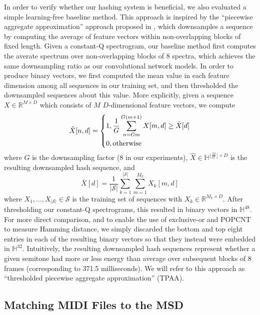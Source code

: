 In order to verify whether our hashing system is beneficial, we also evaluated a simple learning-free baseline method.
This approach is inspired by the ``piecewise aggregate approximation'' approach proposed in \cite{keogh2001dimensionality,yi2000fast}, which downsamples a sequence by computing the average of feature vectors within non-overlapping blocks of fixed length.
Given a constant-Q spectrogram, our baseline method first computes the averate spectrum over non-overlapping blocks of 8 spectra, which achieves the same downsampling ratio as our convolutional network models.
In order to produce binary vectors, we first computed the mean value in each feature dimension among all sequences in our training set, and then thresholded the downsampled sequences about this value.
More explicitly, given a sequence $X \in \mathbb{R}^{M \times D}$ which consists of $M$ $D$-dimensional feature vectors, we compute
\begin{equation}
\hat{X}[n, d] = \begin{dcases}
1, \frac{1}{G} \sum_{n = Gm}^{G(m + 1)} X[m, d] \ge \bar{X}[d]\\
0, \mathrm{otherwise}
\end{dcases}
\end{equation}
where $G$ is the downsampling factor ($8$ in our experiments), $\hat{X} \in \mathbb{H}^{\lfloor \frac{M}{G} \rfloor \times D}$ is the resulting downsampled hash sequence, and
\begin{equation}
\bar{X}[d] = \frac{1}{|\mathcal{S}|} \sum_{k = 1}^{|\mathcal{S}|} \sum_{m = 1}^{M_k} X_k[m, d]
\end{equation}
where $X_1, \ldots, X_{|\mathcal{S}|} \in \mathcal{S}$ is the training set of sequences with $X_k \in \mathbb{R}^{M_k \times D}$.
After thresholding our constant-Q spectrograms, this resulted in binary vectors in $\mathbb{H}^{48}$.
For more direct comparison, and to enable the use of exclusive-or and POPCNT to measure Hamming distance, we simply discarded the bottom and top eight entries in each of the resulting binary vectors so that they instead were embedded in $\mathbb{H}^{32}$.
Intuitively, the resulting downsampled hash sequences represent whether a given semitone had more or less energy than average over subsequent blocks of 8 frames (corresponding to 371.5 milliseconds).
We will refer to this approach as ``thresholded piecewise aggregate approximation'' (TPAA).

\subsection{Matching MIDI Files to the MSD}

